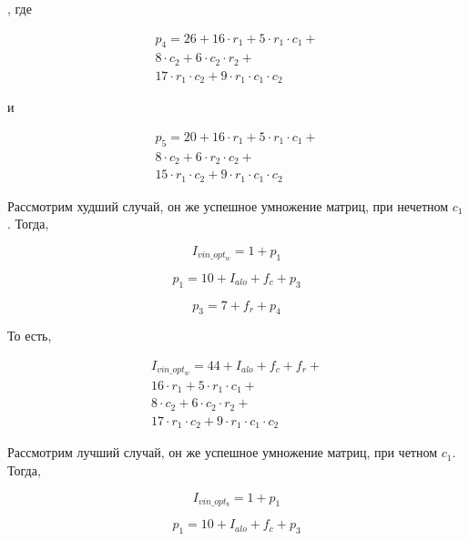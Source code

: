 \begin{enumerate}
    , где

    \begin{eqnarray*}
        p_4 = 26 + 16 \cdot r_1 + 5 \cdot r_1 \cdot c_1 + \\
        8 \cdot c_2 + 6 \cdot c_2 \cdot r_2 + \\
        17 \cdot r_1 \cdot c_2 + 9 \cdot r_1 \cdot c_1 \cdot c_2
    \end{eqnarray*}

    и

    \begin{eqnarray*}
        p_5 = 20 + 16 \cdot r_1 + 5 \cdot r_1 \cdot c_1 + \\
        8 \cdot c_2 + 6 \cdot r_2 \cdot c_2 + \\
        15 \cdot r_1 \cdot c_2 + 9 \cdot r_1 \cdot c_1 \cdot c_2
    \end{eqnarray*}

    Рассмотрим худший случай,
    он же успешное умножение матриц,
    при нечетном $c_1$. Тогда,

    \begin{equation*}
        I_{vin\_opt_w} = 1 + p_1
    \end{equation*}

    \begin{equation*}
        p_1 = 10 + I_{alo} + f_c + p_3
    \end{equation*}

    \begin{equation*}
        p_3 = 7 + f_r + p_4
    \end{equation*}

    То есть,

    \begin{eqnarray*}
        I_{vin\_opt_w} = 44 + I_{alo} + f_c + f_r + \\
        16 \cdot r_1 + 5 \cdot r_1 \cdot c_1 + \\
        8 \cdot c_2 + 6 \cdot c_2 \cdot r_2 + \\
        17 \cdot r_1 \cdot c_2 + 9 \cdot r_1 \cdot c_1 \cdot c_2
    \end{eqnarray*}

    Рассмотрим лучший случай,
    он же успешное умножение матриц,
    при четном $c_1$. Тогда,

    \begin{equation*}
        I_{vin\_opt_b} = 1 + p_1
    \end{equation*}

    \begin{equation*}
        p_1 = 10 + I_{alo} + f_c + p_3
    \end{equation*}


\end{enumerate}
